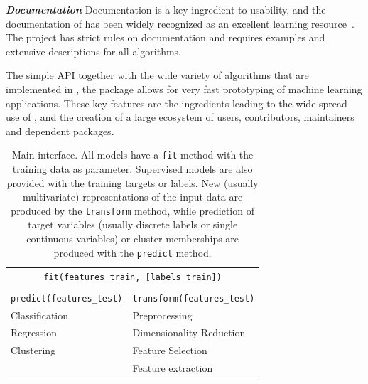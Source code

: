 \emph{\textbf{Documentation}}
Documentation is a key ingredient to usability, and the documentation of \sklearn{}
has been widely recognized as an excellent learning
resource~\autocite{testimonials, benlorica, kdnuggetstopten, lovesklearn}. The
\sklearn{} project has strict rules on documentation and requires examples and
extensive descriptions for all algorithms.

The simple API together with the wide variety of algorithms that are
implemented in \sklearn{}, the package allows for very fast prototyping of
machine learning applications.
These key features are the ingredients leading to the wide-spread use of
\sklearn{}, and the creation of a large ecosystem of users, contributors,
maintainers and dependent packages.

\begin{table}
    \caption{Main \sklearn interface. All models have a \texttt{fit} method
    with the training data as parameter. Supervised models are also provided
    with the training targets or labels. New (usually multivariate)
    representations of the input data are produced by the \texttt{transform}
    method, while prediction of target variables (usually discrete labels or
    single continuous variables) or cluster memberships are produced with the
    \texttt{predict} method.
}
\begin{center}
    \begin{tabular}{p{} p{}}
    \multicolumn{2}{c}{\texttt{fit(features\_train, [labels\_train])}}\\\\
    \texttt{predict(features\_test)} & \texttt{transform(features\_test)}\\
    \cmidrule[1pt](r{1em}){1-1} \cmidrule[1pt](l){2-2}
    Classification & Preprocessing\\
    Regression & Dimensionality Reduction\\
    Clustering & Feature Selection\\
               & Feature extraction\\
\end{tabular}
\end{center}
\label{api}
\end{table}

